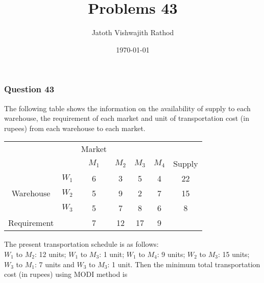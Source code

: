 \documentclass{beamer}
\title[]{Problems 43} %
\author{Jatoth Vishwajith Rathod} %
\institute[] %
{
IIT Hyderabad \\ %
\medskip
\textit{ee16btech11014@iith.ac.in} %
}
\date{\today} %
\begin{document}
\begin{frame}
\titlepage %
\end{frame}






\begin{frame}
\frametitle{Question 43}

\begin{problem}
The following table shows the information on the availability of supply to each warehouse, the requirement of each market and unit of transportation cost (in rupees) from each warehouse to each market.
\begin{table}[!h]
\centering
\begin{tabular}{c c c c c c c}
& & Market & & & & \\
& & $M_1$ & $M_2$ & $M_3$ & $M_4$ & Supply \\
& $W_1$ & 6 & 3 & 5 & 4 & 22 \\
Warehouse & $W_2$ & 5 & 9 & 2 & 7 & 15 \\
& $W_3$ & 5 & 7 & 8 & 6 & 8 \\
Requirement & & 7 & 12 & 17 & 9 & 
\end{tabular}
\end{table}
\medskip
The present transportation schedule is as follows: \\
$W_1$ to $M_2$: 12 units; $W_1$ to $M_3$: 1 unit; $W_1$ to $M_4$: 9 units; $W_2$ to $M_3$: 15 units; $W_3$ to $M_1$: 7 units and $W_3$ to $M_3$: 1 unit. Then the minimum total transportation cost (in rupees) using MODI method is 

\end{problem}

\end{frame}
\end{document}
